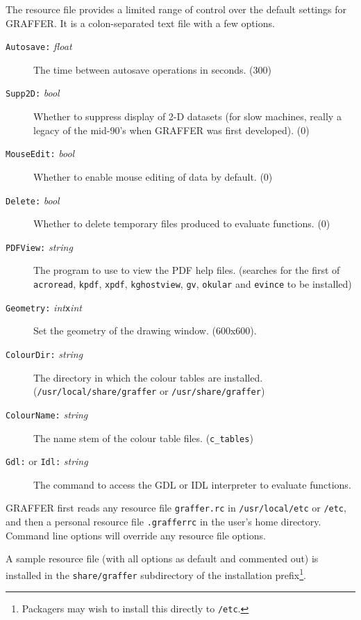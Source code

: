 \documentclass[11pt,twoside,english]{article}
\begin{document}
The resource file provides a limited range of control
over the default settings for GRAFFER. It is a colon-separated text
file with a few options.
\begin{description}
\item[\texttt{Autosave:} \textit{float}] The time between autosave
  operations in seconds. (300)
\item[\texttt{Supp2D:} \textit{bool}] Whether to suppress display of
  2-D datasets (for slow machines, really a legacy of the
  mid-90's when GRAFFER was first developed). (0)
\item[\texttt{MouseEdit:} \textit{bool}] Whether to enable mouse
  editing of data by default. (0)
\item[\texttt{Delete:} \textit{bool}] Whether to delete temporary files
  produced to evaluate functions. (0)
\item[\texttt{PDFView:} \textit{string}] The program to use to view the
  PDF help files. (searches for the first of \texttt{acroread},
  \texttt{kpdf}, \texttt{xpdf}, \texttt{kghostview}, \texttt{gv},
  \texttt{okular} and \texttt{evince} to be installed)
\item[\texttt{Geometry:} \textit{int}\texttt{x}\textit{int}] Set the
  geometry of the drawing window. (600x600).
\item[\texttt{ColourDir:} \textit{string}] The directory in which the
  colour tables are installed. (\texttt{/usr/local/share/graffer} or
  \texttt{/usr/share/graffer})
\item[\texttt{ColourName:} \textit{string}] The name stem of the colour
  table files. (\texttt{c\_tables})
\item[\texttt{Gdl:} or \texttt{Idl:} \textit{string}] The command to
  access the GDL or IDL interpreter to evaluate functions.
\end{description}

GRAFFER first reads any resource file \texttt{graffer.rc} in
\texttt{/usr/local/etc} or \texttt{/etc}, and then a personal resource
file \texttt{.grafferrc} in the user's home directory. Command line
options will override any resource file options.

A sample resource file (with all options as default and commented out) is
installed in the \texttt{share/graffer} subdirectory of the
installation prefix\footnote{Packagers may wish to install this
  directly to \texttt{/etc}.}. 
\end{document}
